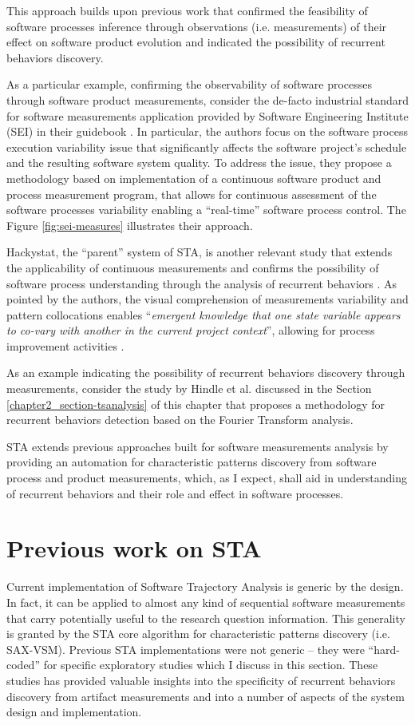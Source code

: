 This approach builds upon previous work that confirmed the feasibility of software processes inference through 
observations (i.e. measurements) of their effect on software product evolution and indicated the possibility of 
recurrent behaviors discovery. 

As a particular example, confirming the observability of software processes through software product measurements, 
consider the de-facto industrial standard for software measurements application provided by 
Software Engineering Institute (SEI) in their guidebook \cite{citeulike:10567306}. 
In particular, the authors focus on the software process execution variability issue that significantly 
affects the software project's schedule and the resulting software system quality. 
To address the issue, they propose a methodology based on implementation of a continuous software product 
and process measurement program, that allows for continuous assessment of the software processes 
variability enabling a ``real-time'' software process control. 
The Figure \ref{fig:sei-measures} illustrates their approach.

Hackystat, the ``parent'' system of STA, is another relevant study that extends the applicability of continuous 
measurements and confirms the possibility of software process understanding through the analysis of recurrent 
behaviors \cite{citeulike:557296}. 
As pointed by the authors, the visual comprehension of measurements variability and pattern collocations enables 
``\textit{emergent knowledge that one state variable appears to co-vary with another in the current project context}'',
allowing for process improvement activities \cite{citeulike:557296}. 

As an example indicating the possibility of recurrent behaviors discovery through measurements, consider the 
study by Hindle et al. \cite{citeulike:10377345} discussed in the Section \ref{chapter2_section-tsanalysis} of 
this chapter that proposes a methodology for recurrent behaviors detection based on the Fourier Transform analysis.

STA extends previous approaches built for software measurements analysis by providing an automation for 
characteristic patterns discovery from software process and product measurements, which, as I expect, shall 
aid in understanding of recurrent behaviors and their role and effect in software processes.

\section{Previous work on STA}
Current implementation of Software Trajectory Analysis is generic by the design. In fact, it can be applied 
to almost any kind of sequential software measurements that carry potentially useful to the research 
question information. 
This generality is granted by the STA core algorithm for characteristic patterns discovery (i.e. SAX-VSM). 
Previous STA implementations were not generic -- they were ``hard-coded'' for specific exploratory studies 
which I discuss in this section. These studies has provided valuable insights into the specificity of recurrent 
behaviors discovery from artifact measurements and into a number of aspects of the system design 
and implementation.

